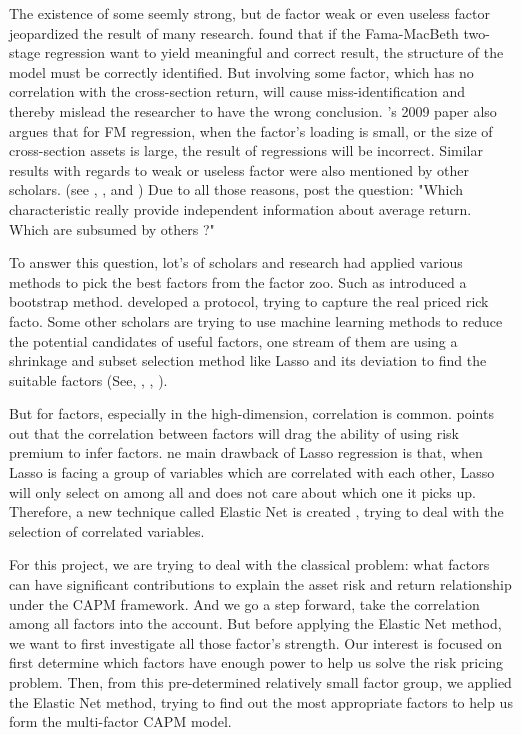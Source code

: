 \documentclass[12pt]{article}
\begin{document}
The existence of some seemly strong, but de factor weak or even useless factor jeopardized the result of many research.
 found that if the Fama-MacBeth two-stage regression\cite{Fama1973} want to  yield meaningful and correct result, the structure of the model must be correctly identified. 
But involving some factor, which has no correlation with the cross-section return, will cause miss-identification and thereby mislead the researcher to have the wrong conclusion. 
\citeauthor{Kleibergen2009}'s 2009 paper also argues that for FM regression, when the factor's loading is small, or the size of cross-section assets is large, the result of regressions will be incorrect.
Similar results with regards to weak or useless factor were also mentioned by other scholars. 
(see , , and )
Due to all those reasons, \cite{Cochrane2011} post the question: "Which characteristic really provide independent information about average return. Which are subsumed by others ?"

To answer this question, lot's of scholars and research had applied various methods to pick the best factors from the factor zoo.
Such as  introduced a bootstrap method.  
 developed a protocol, trying to capture the real priced rick facto.
Some other scholars are trying to use machine learning methods to reduce the potential candidates of useful factors, one stream of them are using a shrinkage and subset selection method like Lasso \cite{Tibshirani1996} and its deviation to find the suitable factors (See, , , ).

But for factors, especially in the high-dimension, correlation is common. 
 points out that the correlation between factors will drag the ability of using risk premium to infer factors.
ne main drawback of Lasso regression is that, when Lasso is facing a group of variables which are correlated with each other, Lasso will only select on among all and does not care about which one it picks up. 
Therefore, a new technique called Elastic Net is created \cite{Zou2005}, trying to deal with the selection of correlated variables. 


For this project, we are trying to deal with the classical problem: what factors can have significant contributions to explain the asset risk and return relationship under the CAPM framework.
And we go a step forward, take the correlation among all factors into the account. 
But before applying the Elastic Net method, we want to first investigate all those factor's strength.
Our interest is focused on first determine which factors have enough power to help us solve the risk pricing problem. 
Then, from this pre-determined relatively small factor group, we applied the Elastic Net method, trying to find out the most appropriate factors to help us form the multi-factor CAPM model.
\end{document}
